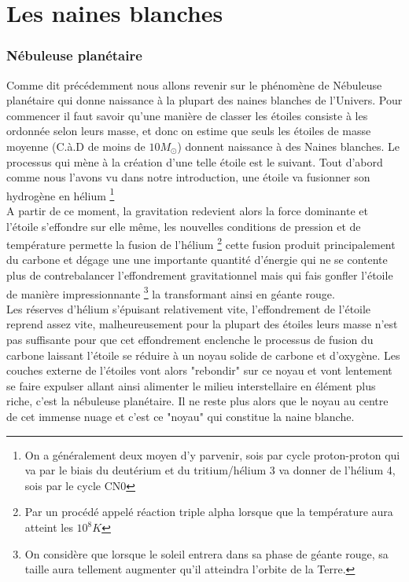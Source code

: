 \documentclass[a4paper]{rapport}
\begin{document}
\part{Les naines blanches}
\section{Nébuleuse planétaire}
Comme dit précédemment nous allons revenir sur le phénomène de Nébuleuse planétaire qui donne naissance à la plupart des naines blanches de l'Univers.\nl
Pour commencer il faut savoir qu'une manière de classer les étoiles consiste à les ordonnée selon leurs masse, et donc on estime que seuls les étoiles de masse moyenne (C.à.D de moins de $10M_{\odot}$) donnent naissance à des Naines blanches. Le processus qui mène à la création d'une telle étoile est le suivant.\nl
Tout d'abord comme nous l'avons vu dans notre introduction, une étoile va fusionner son hydrogène en hélium \footnote{On a généralement deux moyen d'y parvenir, sois par cycle proton-proton qui va par le biais du deutérium et du tritium/hélium 3 va donner de l'hélium 4, sois par le cycle CN0}\\
A partir de ce moment, la gravitation redevient alors la force dominante et l'étoile s’effondre sur elle même, les nouvelles conditions de pression et de température permette la fusion de l’hélium \footnote{Par un procédé appelé réaction triple alpha lorsque que la température aura atteint les $10^8 K$} cette fusion produit principalement du carbone et dégage une une importante quantité d'énergie qui ne se contente plus de contrebalancer l'effondrement gravitationnel mais qui fais gonfler l'étoile de manière impressionnante \footnote{On considère que lorsque le soleil entrera dans sa phase de géante rouge, sa taille aura tellement augmenter qu'il atteindra l'orbite de la Terre.} la transformant ainsi en géante rouge.\\
Les réserves d'hélium s’épuisant relativement vite, l’effondrement de l'étoile reprend assez vite, malheureusement pour la plupart des étoiles leurs masse n'est pas suffisante pour que cet effondrement enclenche le processus de fusion du carbone laissant l'étoile se réduire à un noyau solide de carbone et d'oxygène. Les couches externe de l'étoiles vont alors "rebondir" sur ce noyau et vont lentement se faire expulser allant ainsi alimenter le milieu interstellaire en élément plus riche, c'est la nébuleuse planétaire. Il ne reste plus alors que le noyau au centre de cet immense nuage et c'est ce "noyau" qui constitue la naine blanche.
\end{document}
